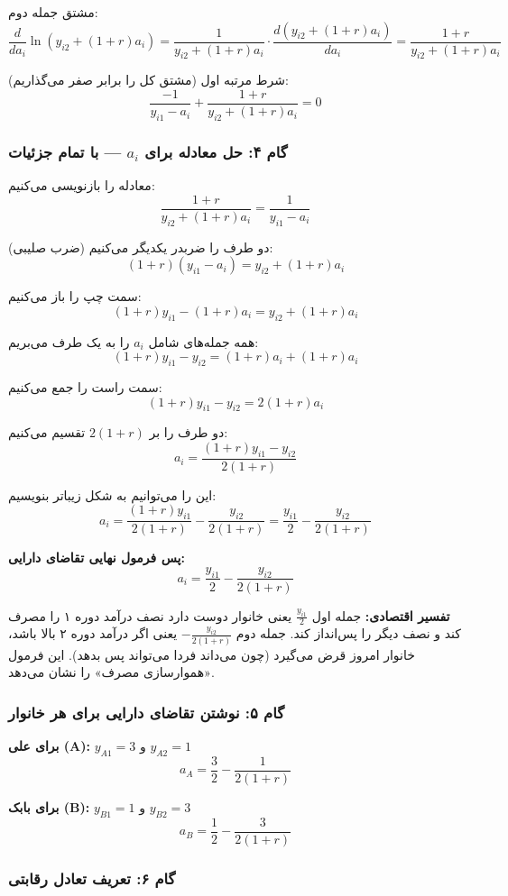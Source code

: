 \documentclass[12pt,a4paper]{article}
\begin{document}
مشتق جمله دوم:
\[
	\frac{d}{da_i} \ln(y_{i2} + (1+r) a_i) = \frac{1}{y_{i2} + (1+r) a_i} \cdot \frac{d(y_{i2} + (1+r)a_i)}{da_i} = \frac{1+r}{y_{i2} + (1+r)a_i}
\]

شرط مرتبه اول (مشتق کل را برابر صفر می‌گذاریم):
\[
	\frac{-1}{y_{i1} - a_i} + \frac{1+r}{y_{i2} + (1+r) a_i} = 0
\]

\subsubsection{گام ۴: حل معادله برای $a_i$ — با تمام جزئیات}

معادله را بازنویسی می‌کنیم:
\[
	\frac{1+r}{y_{i2} + (1+r) a_i} = \frac{1}{y_{i1} - a_i}
\]

دو طرف را ضربدر یکدیگر می‌کنیم (ضرب صلیبی):
\[
	(1+r)(y_{i1} - a_i) = y_{i2} + (1+r) a_i
\]

سمت چپ را باز می‌کنیم:
\[
	(1+r) y_{i1} - (1+r) a_i = y_{i2} + (1+r) a_i
\]

همه جمله‌های شامل $a_i$ را به یک طرف می‌بریم:
\[
	(1+r) y_{i1} - y_{i2} = (1+r) a_i + (1+r) a_i
\]

سمت راست را جمع می‌کنیم:
\[
	(1+r) y_{i1} - y_{i2} = 2(1+r) a_i
\]

دو طرف را بر $2(1+r)$ تقسیم می‌کنیم:
\[
	a_i = \frac{(1+r) y_{i1} - y_{i2}}{2(1+r)}
\]

این را می‌توانیم به شکل زیباتر بنویسیم:
\[
	a_i = \frac{(1+r) y_{i1}}{2(1+r)} - \frac{y_{i2}}{2(1+r)} = \frac{y_{i1}}{2} - \frac{y_{i2}}{2(1+r)}
\]

\textbf{پس فرمول نهایی تقاضای دارایی:}
\[
	\boxed{a_i = \frac{y_{i1}}{2} - \frac{y_{i2}}{2(1+r)}}
\]

\textbf{تفسیر اقتصادی:} جمله اول $\frac{y_{i1}}{2}$ یعنی خانوار دوست دارد نصف درآمد دوره ۱ را مصرف کند و نصف دیگر را پس‌انداز کند. جمله دوم $-\frac{y_{i2}}{2(1+r)}$ یعنی اگر درآمد دوره ۲ بالا باشد، خانوار امروز قرض می‌گیرد (چون می‌داند فردا می‌تواند پس بدهد). این فرمول «هموارسازی مصرف» را نشان می‌دهد.

\subsubsection{گام ۵: نوشتن تقاضای دارایی برای هر خانوار}

\textbf{برای علی (A):} $y_{A1} = 3$ و $y_{A2} = 1$
\[
	a_A = \frac{3}{2} - \frac{1}{2(1+r)}
\]

\textbf{برای بابک (B):} $y_{B1} = 1$ و $y_{B2} = 3$
\[
	a_B = \frac{1}{2} - \frac{3}{2(1+r)}
\]

\subsubsection{گام ۶: تعریف تعادل رقابتی}
\end{document}

